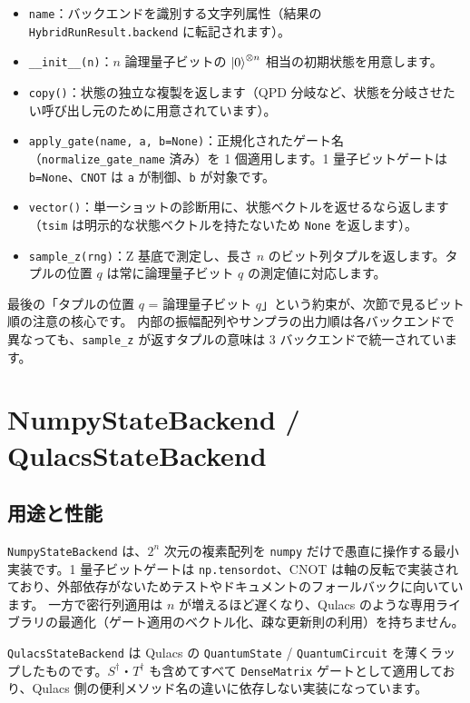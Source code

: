 \begin{itemize}
  \item \texttt{name}：バックエンドを識別する文字列属性（結果の \texttt{HybridRunResult.backend} に転記されます）。
  \item \texttt{\_\_init\_\_(n)}：$n$ 論理量子ビットの $\ket{0}^{\otimes n}$ 相当の初期状態を用意します。
  \item \texttt{copy()}：状態の独立な複製を返します（QPD 分岐など、状態を分岐させたい呼び出し元のために用意されています）。
  \item \texttt{apply\_gate(name, a, b=None)}：正規化されたゲート名（\texttt{normalize\_gate\_name} 済み）を 1 個適用します。1 量子ビットゲートは \texttt{b=None}、\texttt{CNOT} は \texttt{a} が制御、\texttt{b} が対象です。
  \item \texttt{vector()}：単一ショットの診断用に、状態ベクトルを返せるなら返します（\texttt{tsim} は明示的な状態ベクトルを持たないため \texttt{None} を返します）。
  \item \texttt{sample\_z(rng)}：Z 基底で測定し、長さ $n$ のビット列タプルを返します。タプルの位置 $q$ は常に論理量子ビット $q$ の測定値に対応します。
\end{itemize}

最後の「タプルの位置 $q$ = 論理量子ビット $q$」という約束が、次節で見るビット順の注意の核心です。
内部の振幅配列やサンプラの出力順は各バックエンドで異なっても、\texttt{sample\_z} が返すタプルの意味は 3 バックエンドで統一されています。

\section{NumpyStateBackend / QulacsStateBackend}\label{sec:numpy_qulacs}

\subsection{用途と性能}

\texttt{NumpyStateBackend} は、$2^n$ 次元の複素配列を \texttt{numpy} だけで愚直に操作する最小実装です。1 量子ビットゲートは \texttt{np.tensordot}、CNOT は軸の反転で実装されており、外部依存がないためテストやドキュメントのフォールバックに向いています。
一方で密行列適用は $n$ が増えるほど遅くなり、Qulacs のような専用ライブラリの最適化（ゲート適用のベクトル化、疎な更新則の利用）を持ちません。

\texttt{QulacsStateBackend} は Qulacs の \texttt{QuantumState} / \texttt{QuantumCircuit} を薄くラップしたものです。$S^\dagger$・$T^\dagger$ も含めてすべて \texttt{DenseMatrix} ゲートとして適用しており、Qulacs 側の便利メソッド名の違いに依存しない実装になっています。

